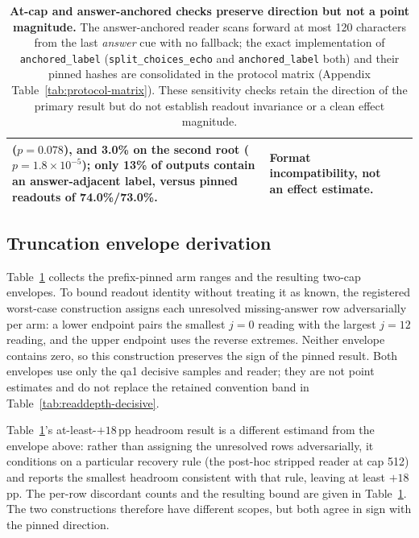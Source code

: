 \begin{table}[H]
\begin{tabular}{@{}>{\raggedright\arraybackslash}p{}
>{\raggedright\arraybackslash}p{}
>{\raggedright\arraybackslash}p{}@{}}
($p{=}0.078$), and 3.0\% on the second root ($p{=}1.8\times10^{-5}$); only
13\% of outputs contain an answer-adjacent label, versus pinned readouts of
74.0\%/73.0\%. & Format incompatibility, not an effect estimate. \\
\bottomrule
\end{tabular}
\caption{\textbf{At-cap and answer-anchored checks preserve direction but not a
point magnitude.}  The
answer-anchored reader scans forward at most 120 characters from the last
\emph{answer} cue with no fallback; the exact implementation of
\texttt{anchored\_label} (\texttt{split\_choices\_echo} and
\texttt{anchored\_label} both) and their pinned hashes are consolidated in the
protocol matrix (Appendix Table~\ref{tab:protocol-matrix}).  These sensitivity
checks retain the direction of the primary result but do not establish readout
invariance or a clean effect magnitude.}
\label{tab:invariance-diagnostics}
\end{table}

\subsection{Truncation envelope derivation}
\label{app:truncation-envelope}
Table~\ref{tab:invariance-diagnostics} collects the prefix-pinned arm ranges
and the resulting two-cap envelopes.  To bound readout identity without
treating it as known, the registered worst-case construction assigns each
unresolved missing-answer row adversarially per arm: a lower endpoint pairs the
smallest $j{=}0$ reading with the largest $j{=}12$ reading, and the upper
endpoint uses the reverse extremes.  Neither envelope contains zero, so this
construction preserves the sign of the pinned result.  Both envelopes use only
the qa1 decisive samples and reader; they are not point estimates and do not
replace the retained convention band in Table~\ref{tab:readdepth-decisive}.

\noindent\begin{minipage}{\textwidth}
Table~\ref{tab:invariance-diagnostics}'s at-least-$+18$\,pp headroom result is a
different estimand from the envelope above: rather than assigning the unresolved
rows adversarially, it conditions on a particular recovery rule (the post-hoc
stripped reader at cap 512) and reports the smallest headroom consistent with
that rule, leaving at least $+18$\,pp.  The per-row discordant counts and the
resulting bound are given in Table~\ref{tab:invariance-diagnostics}.  The two
constructions therefore have different scopes, but both agree in sign with the
pinned direction.
\end{minipage}

